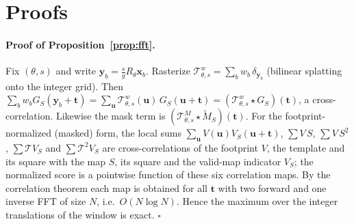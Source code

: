 \appendix
\section{Proofs}
\label{app:proofs}

\paragraph{Proof of Proposition~\ref{prop:fft}.}
Fix $(\theta,s)$ and write $\mathbf{y}_b=\tfrac{s}{g}R_\theta\mathbf{x}_b$.
Rasterize $\mathcal{T}^w_{\theta,s}=\sum_b w_b\,\delta_{\mathbf{y}_b}$
(bilinear splatting onto the integer grid). Then
$\sum_b w_b G_S(\mathbf{y}_b+\mathbf{t})=\sum_{\mathbf{u}}\mathcal{T}^w_{\theta,s}(\mathbf{u})\,G_S(\mathbf{u}+\mathbf{t})
=(\mathcal{T}^w_{\theta,s}\star G_S)(\mathbf{t})$, a cross-correlation.
Likewise the mask term is $(\mathcal{T}^M_{\theta,s}\star\tilde M_S)(\mathbf{t})$.
For the footprint-normalized (masked) form, the local sums
$\sum_{\mathbf{u}}V(\mathbf{u})V_S(\mathbf{u}+\mathbf{t})$,
$\sum V\,S$, $\sum V\,S^2$, $\sum \mathcal{T}V_S$ and $\sum \mathcal{T}^2V_S$ are
cross-correlations of the footprint $V$, the template and its square with the
map $S$, its square and the valid-map indicator $V_S$; the normalized score is
a pointwise function of these six correlation maps. By the correlation
theorem each map is obtained for all $\mathbf{t}$ with two forward and one
inverse FFT of size $N$, i.e.\ $O(N\log N)$. Hence the maximum over the integer
translations of the window is exact. $\square$

